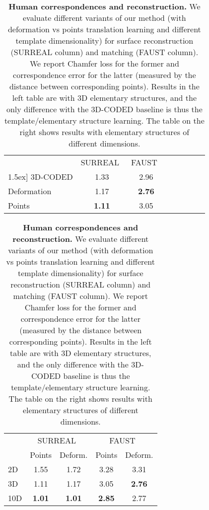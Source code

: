\documentclass{article}
\begin{document}
\vspace{-.5em}
\begin{table}
\footnotesize
\centering
\begin{tabular}{l*{6}{c}r}
           & SURREAL~\cite{varol17_surreal}  & FAUST~\cite{bogo2014cvpr} \\
\-1.5ex]
3D-CODED                & 1.33 & 2.96 \\
Deformation & 1.17 & \textbf{2.76}  \\
Points      & { \bf 1.11 } & 3.05 \\

\end{tabular}
\quad
\begin{tabular}{lcc|cc}
        &\multicolumn{2}{c|}{SURREAL~\cite{varol17_surreal}}&\multicolumn{2}{c}{FAUST~\cite{bogo2014cvpr}}\\
         & Points & Deform. & Points & Deform. \\
        \hline
         2D     & 1.55& 1.72 & 3.28  & 3.31 \\
         3D     & 1.11 & 1.17 & 3.05 & \textbf{2.76} \\        
         10D    & \textbf{1.01}  & \textbf{1.01} & \textbf{2.85} & 2.77\\
\end{tabular}
\vspace{1em}
\caption{ \textbf{Human correspondences and reconstruction.} We evaluate different variants of our method (with deformation vs points translation learning and different template dimensionality) for surface reconstruction (SURREAL column) and matching (FAUST column). We report Chamfer loss for the former and correspondence error for the latter (measured by the distance between corresponding points). Results in the left table are with 3D elementary structures, and the only difference with the 3D-CODED baseline is thus the template/elementary structure learning. The table on the right shows results with elementary structures of different dimensions.}
\label{tab:faust}
\vspace{-2em}
\end{table}
\end{document}
